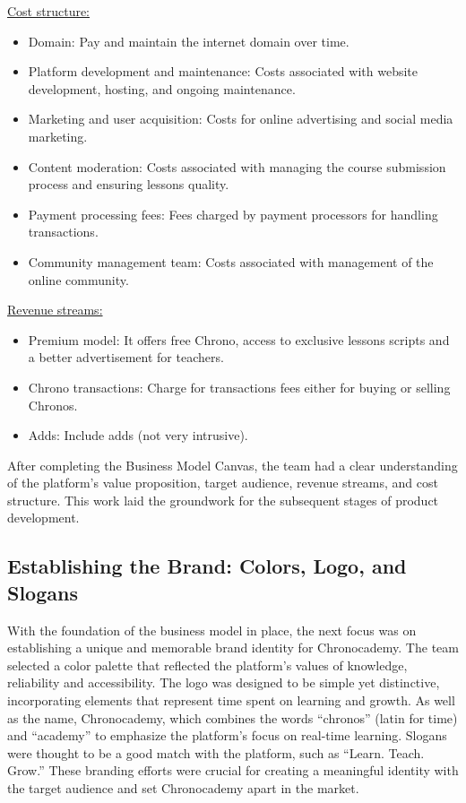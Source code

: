 \underline{Cost structure:}
\begin{itemize}
\item Domain: Pay and maintain the internet domain over time.
\item Platform development and maintenance: Costs associated with website development, hosting, and ongoing maintenance.
\item Marketing and user acquisition: Costs for online advertising and social media marketing.
\item Content moderation: Costs associated with managing the course submission process and ensuring lessons quality.
\item Payment processing fees: Fees charged by payment processors for handling transactions.
\item Community management team: Costs associated with management of the online community.
\end{itemize}

\underline{Revenue streams:}
\begin{itemize}
\item Premium model: It offers free Chrono, access to exclusive lessons scripts and a better advertisement for teachers.
\item Chrono transactions: Charge for transactions fees either for buying or selling Chronos.
\item Adds: Include adds (not very intrusive).
\end{itemize}

After completing the Business Model Canvas, the team had a clear understanding of the platform's value proposition, target audience, revenue streams, and cost structure.
This work laid the groundwork for the subsequent stages of product development.

\subsection{Establishing the Brand: Colors, Logo, and Slogans}\label{subsec:colors-logo-slogans}
With the foundation of the business model in place, the next focus was on establishing a unique and memorable brand identity for Chronocademy.
The team selected a color palette that reflected the platform’s values of knowledge, reliability and accessibility.
The logo was designed to be simple yet distinctive, incorporating elements that represent time spent on learning and growth.
As well as the name, Chronocademy, which combines the words ``chronos'' (latin for time) and ``academy'' to emphasize the platform's focus on real-time learning.
Slogans were thought to be a good match with the platform, such as ``Learn.
Teach.
Grow.'' These branding efforts were crucial for creating a meaningful identity with the target audience and set Chronocademy apart in the market.

